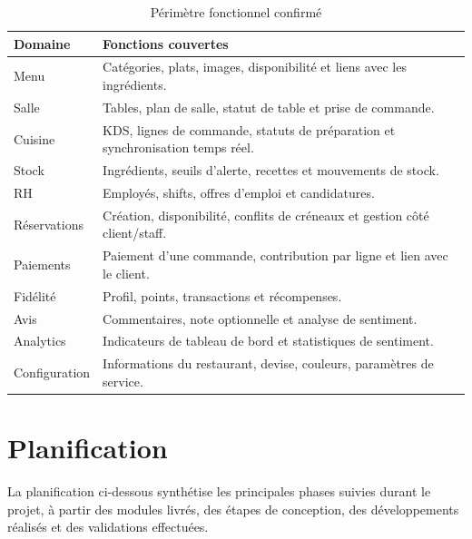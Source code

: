 \begin{table}[H]
\centering
\caption{Périmètre fonctionnel confirmé}
\label{tab:perimetre}
\begin{tabularx}{\textwidth}{p{3.2cm}Y}
\toprule
\textbf{Domaine} & \textbf{Fonctions couvertes} \\
\midrule
Menu & Catégories, plats, images, disponibilité et liens avec les ingrédients. \\
Salle & Tables, plan de salle, statut de table et prise de commande. \\
Cuisine & KDS, lignes de commande, statuts de préparation et synchronisation temps réel. \\
Stock & Ingrédients, seuils d'alerte, recettes et mouvements de stock. \\
RH & Employés, shifts, offres d'emploi et candidatures. \\
Réservations & Création, disponibilité, conflits de créneaux et gestion côté client/staff. \\
Paiements & Paiement d'une commande, contribution par ligne et lien avec le client. \\
Fidélité & Profil, points, transactions et récompenses. \\
Avis & Commentaires, note optionnelle et analyse de sentiment. \\
Analytics & Indicateurs de tableau de bord et statistiques de sentiment. \\
Configuration & Informations du restaurant, devise, couleurs, paramètres de service. \\
\bottomrule
\end{tabularx}
\end{table}

\section{Planification}
La planification ci-dessous synthétise les principales phases suivies durant le projet, à partir des modules livrés, des étapes de conception, des développements réalisés et des validations effectuées.

